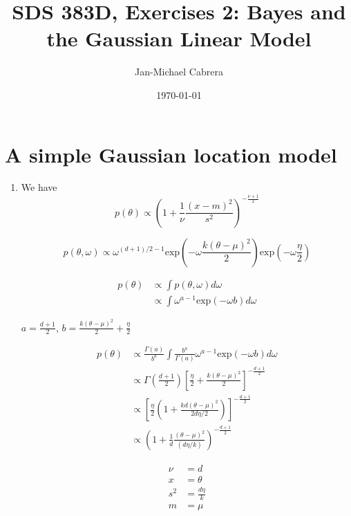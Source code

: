 \documentclass[10pt]{article}
\begin{document}
    \title{SDS 383D, Exercises 2: Bayes and the Gaussian Linear Model}
    \author{Jan-Michael Cabrera}
    \date{\today}
    \maketitle

    \section*{A simple Gaussian location model}

    \begin{enumerate}[label=(\Alph*)]
      \item We have
        $$ p(\theta) \propto \left ( 1 + \frac{1}{\nu} \frac{(x - m)^2}{s^2}\right )^{- \frac{\nu + 1}{2}}$$

        $$p(\theta, \omega) \propto \omega^{(d+1)/2 - 1} \text{exp}\left( -\omega \frac{k (\theta - \mu)^2}{2}\right ) \text{exp}\left ( -\omega \frac{\eta}{2}\right)$$

        \begin{align*}
          p(\theta) &\propto \int p(\theta, \omega) d \omega \\
          & \propto \int \omega^{a-1} \text{exp}(- \omega b) d\omega
        \end{align*}

        $a = \frac{d+1}{2}$, $b = \frac{k (\theta - \mu)^2}{2} + \frac{\eta}{2}$

        \begin{align*}
          p(\theta) & \propto \frac{\Gamma(a)}{b^a} \int \frac{b^a}{\Gamma(a)} \omega^{a-1} \text{exp}(- \omega b) d\omega \\
          & \propto \Gamma \left ( \frac{d+1}{2} \right) \left [ \frac{\eta}{2} + \frac{k (\theta - \mu)^2}{2}\right]^{- \frac{d+1}{2}} \\
          & \propto \left [ \frac{\eta}{2} \left (1 + \frac{kd (\theta - \mu)^2}{2 d \eta/2} \right )\right]^{- \frac{d+1}{2}} \\
          & \propto \left ( 1 + \frac{1}{d} \frac{(\theta - \mu)^2}{(d \eta/ k)}\right)^{- \frac{d+1}{2}}
        \end{align*}

        \begin{align*}
          \nu &= d \\
          x &= \theta \\
          s^2 & = \frac{d \eta}{k}\\
          m & = \mu
        \end{align*}



\end{enumerate}
\end{document}
